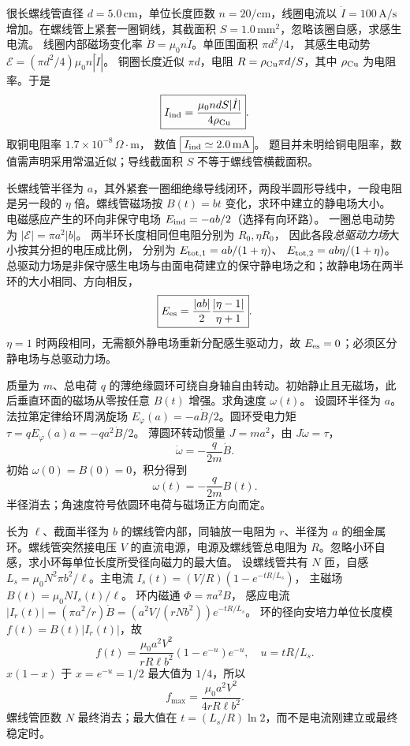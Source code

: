 很长螺线管直径 $d=5.0\,\mathrm{cm}$，单位长度匝数 $n=20/\mathrm{cm}$，线圈电流以 $\dot I=100\,\mathrm{A/s}$ 增加。在螺线管上紧套一圈铜线，其截面积 $S=1.0\,\mathrm{mm^2}$，忽略该圈自感，求感生电流。
\exsolution
线圈内部磁场变化率
$\dot B=\mu_0n\dot I$。单匝围面积 $\pi d^2/4$，
其感生电动势
$\mathcal E=(\pi d^2/4)\mu_0n|\dot I|$。
铜圈长度近似 $\pi d$，电阻
$R=\rho_{\rm Cu}\pi d/S$，其中 $\rho_{\rm Cu}$ 为电阻率。于是
\[
\boxed{I_{\rm ind}=\frac{\mu_0ndS|\dot I|}{4\rho_{\rm Cu}}}.
\]
取铜电阻率 $1.7\times10^{-8}\,\Omega\cdot\mathrm m$，
数值 $\boxed{I_{\rm ind}\simeq2.0\,\mathrm{mA}}$。
\excheck 题目并未明给铜电阻率，数值需声明采用常温近似；导线截面积 $S$ 不等于螺线管横截面积。

长螺线管半径为 $a$，其外紧套一圈细绝缘导线闭环，两段半圆形导线中，一段电阻是另一段的 $\eta$ 倍。螺线管磁场按 $B(t)=bt$ 变化，求环中建立的静电场大小。
\exsolution
电磁感应产生的环向非保守电场
$E_{\rm ind}=-ab/2$（选择有向环路）。
一圈总电动势为 $|\mathcal E|=\pi a^2|b|$。
两半环长度相同但电阻分别为 $R_0,\eta R_0$，
因此各段\emph{总驱动力场}大小按其分担的电压成比例，
分别为
$E_{{\rm tot},1}=ab/(1+\eta)$、
$E_{{\rm tot},2}=ab\eta/(1+\eta)$。
总驱动力场是非保守感生电场与由面电荷建立的保守静电场之和；故静电场在两半环的大小相同、方向相反，
\[
\boxed{E_{\rm es}=\frac{|ab|}{2}
\frac{|\eta-1|}{\eta+1}}.
\]
\excheck $\eta=1$ 时两段相同，无需额外静电场重新分配感生驱动力，故 $E_{\rm es}=0$；必须区分静电场与总驱动力场。

质量为 $m$、总电荷 $q$ 的薄绝缘圆环可绕自身轴自由转动。初始静止且无磁场，此后垂直环面的磁场从零按任意 $B(t)$ 增强。求角速度 $\omega(t)$。
\exsolution
设圆环半径为 $a$。法拉第定律给环周涡旋场
$E_\varphi(a)=-a\dot B/2$。圆环受电力矩
$\tau=qE_\varphi(a)a=-qa^2\dot B/2$。
薄圆环转动惯量 $J=ma^2$，由
$J\dot\omega=\tau$，
\[
\dot\omega=-\frac q{2m}\dot B.
\]
初始 $\omega(0)=B(0)=0$，积分得到
\[
\boxed{\omega(t)=-\frac q{2m}B(t)}.
\]
\excheck 半径消去；角速度符号依圆环电荷与磁场正方向而定。

长为 $\ell$、截面半径为 $b$ 的螺线管内部，同轴放一电阻为 $r$、半径为 $a$ 的细金属环。螺线管突然接电压 $V$ 的直流电源，电源及螺线管总电阻为 $R$。忽略小环自感，求小环每单位长度所受径向磁力的最大值。
\exsolution
设螺线管共有 $N$ 匝，自感
$L_s=\mu_0N^2\pi b^2/\ell$。主电流
$I_s(t)=(V/R)(1-e^{-tR/L_s})$，
主磁场
$B(t)=\mu_0NI_s(t)/\ell$。
环内磁通 $\Phi=\pi a^2B$，
感应电流
$|I_r(t)|=(\pi a^2/r)\dot B
=(a^2V/(rNb^2))e^{-tR/L_s}$。
环的径向安培力单位长度模
$f(t)=B(t)|I_r(t)|$，故
\[
f(t)=\frac{\mu_0a^2V^2}{rR\ell b^2}
(1-e^{-u})e^{-u},\quad u=tR/L_s.
\]
$x(1-x)$ 于 $x=e^{-u}=1/2$ 最大值为 $1/4$，所以
\[
\boxed{f_{\max}=\frac{\mu_0a^2V^2}{4rR\ell b^2}}.
\]
\excheck 螺线管匝数 $N$ 最终消去；最大值在 $t=(L_s/R)\ln2$，而不是电流刚建立或最终稳定时。


